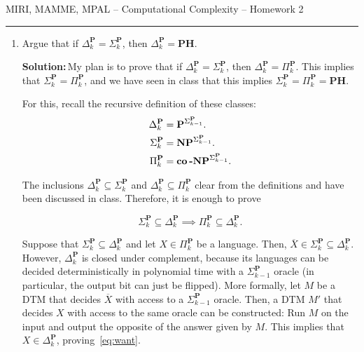 \documentclass{amsart}
\theoremstyle{plain}
\theoremstyle{definition}
\newcommand{\np}{\textbf{NP}}
\newcommand{\p}{\textbf{P}}
\newcommand{\conp}{\textbf{co\,-NP}}
\newcommand{\ph}{\textbf{PH}}
\newcommand{\sol}{\textbf{Solution:\,}}
\newcommand{\ov}[1]{\overline{#1}}
\begin{document}
    {\Large MIRI, MAMME, MPAL -- Computational Complexity -- Homework 2}

    \vspace{0.5cm}

    \hrule

    \vspace{0.5cm}

    \begin{enumerate}[label=\textbf{Exercise \arabic*:}, leftmargin=0cm, labelwidth=-0.2cm, align=left]

        \item
            Argue that if $\Delta_k^\p = \Sigma_k^\p$, then $\Delta_k^\p=$\ph\@.

            \sol My plan is to prove that if $\Delta_k^\p = \Sigma_k^\p$, then $\Delta_k^\p=\Pi_k^\p$.
            This implies that $\Sigma_k^\p = \Pi_k^\p$, and we have seen in class that
            this implies $\Sigma_k^\p = \Pi_k^\p = \ph$.

            For this, recall the recursive definition of these classes:
            \begin{align*}
                \Delta_k^\p &= \p^{\Sigma_{k-1}^\p}. \\
                \Sigma_k^\p &= \np^{\Sigma_{k-1}^\p}. \\
                \Pi_k^\p &= \conp^{\Sigma_{k-1}^\p}.
            \end{align*}

            The inclusions $\Delta_k^\p \subseteq \Sigma_k^\p$ and $\Delta_k^\p \subseteq \Pi_k^\p$ clear
            from the definitions and have been discussed in class.
            Therefore, it is enough to prove

            \begin{equation}
                \Sigma_k^\p \subseteq \Delta_k^\p \implies \Pi_k^\p \subseteq \Delta_k^\p.\label{eq:want}
            \end{equation}

            Suppose that $\Sigma_k^\p \subseteq \Delta_k^\p$ and let $X \in \Pi_k^\p$ be a language.
            Then, $\ov{X} \in \Sigma_k^\p \subseteq \Delta_k^\p$.
            However, $\Delta_k^\p$ is closed under complement, because its languages can be decided
            deterministically in polynomial time with a $\Sigma_{k-1}^\p$ oracle
            (in particular, the output bit can just be flipped).
            More formally, let $M$ be a DTM that decides $\ov{X}$ with access to a $\Sigma_{k-1}^\p$ oracle.
            Then, a DTM $M'$ that decides $X$ with access to the same oracle can be constructed:
            Run $M$ on the input and output the opposite of the answer given by $M$.
            This implies that $X \in \Delta_k^\p$, proving~\eqref{eq:want}.


\end{enumerate}
\end{document}
